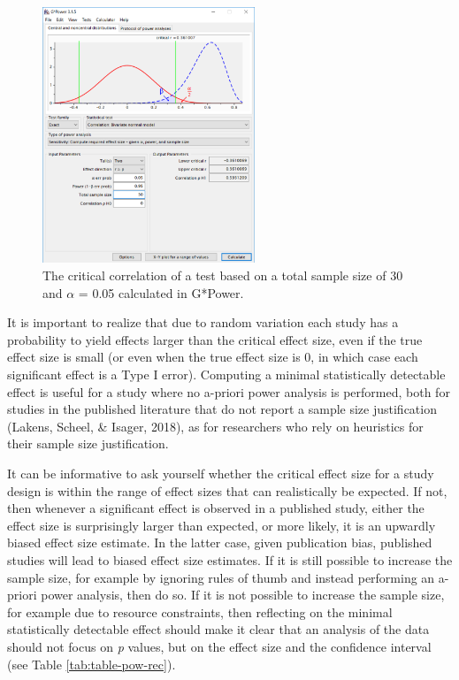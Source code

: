 \documentclass[
  english,
  ,jou, a4paper,floatsintext]{apa6}
\begin{document}
\begin{figure}
\includegraphics[width=240px]{images/gpowcrit2} \caption{The critical correlation of a test based on a total sample size of 30 and $\alpha$ = 0.05 calculated in G*Power.}\label{fig:gcrit2}
\end{figure}

It is important to realize that due to random variation each study has a probability to yield effects larger than the critical effect size, even if the true effect size is small (or even when the true effect size is 0, in which case each significant effect is a Type I error). Computing a minimal statistically detectable effect is useful for a study where no a-priori power analysis is performed, both for studies in the published literature that do not report a sample size justification (Lakens, Scheel, \& Isager, 2018), as for researchers who rely on heuristics for their sample size justification.

It can be informative to ask yourself whether the critical effect size for a study design is within the range of effect sizes that can realistically be expected. If not, then whenever a significant effect is observed in a published study, either the effect size is surprisingly larger than expected, or more likely, it is an upwardly biased effect size estimate. In the latter case, given publication bias, published studies will lead to biased effect size estimates. If it is still possible to increase the sample size, for example by ignoring rules of thumb and instead performing an a-priori power analysis, then do so. If it is not possible to increase the sample size, for example due to resource constraints, then reflecting on the minimal statistically detectable effect should make it clear that an analysis of the data should not focus on \emph{p} values, but on the effect size and the confidence interval (see Table \ref{tab:table-pow-rec}).
\end{document}
